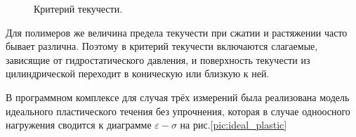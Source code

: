 \begin{figure}
\caption{Критерий текучести.}
\label{pic:mizes}
\end{figure}

Для полимеров же величина предела текучести при сжатии и растяжении часто бывает различна. Поэтому в критерий текучести включаются слагаемые, зависящие от гидростатического давления, и поверхность текучести из цилиндрической переходит в коническую или близкую к ней.

В программном комплексе для случая трёх измерений была реализована модель идеального пластического течения без упрочнения, которая в случае одноосного нагружения сводится к диаграмме $\varepsilon-\sigma$ на рис.\ref{pic:ideal_plastic}

